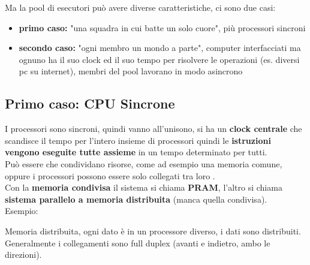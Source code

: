 Ma la pool di esecutori può avere diverse caratteristiche, ci sono due casi: 
\begin{itemize}
	\item \textbf{primo caso:} "una squadra in cui batte un solo cuore", più processori sincroni
	\item \textbf{secondo caso:} "ogni membro un mondo a parte", computer interfacciati ma ognuno ha il suo clock ed il suo tempo per risolvere le operazioni (es. diversi pc su internet), membri del pool lavorano in modo asincrono 
\end{itemize}


\subsection*{Primo caso: CPU Sincrone}
I processori sono sincroni, quindi vanno all'unisono, si ha un \textbf{clock centrale} che scandisce il tempo per l'intero insieme di processori quindi le \textbf{istruzioni vengono eseguite tutte assieme} in un tempo determinato per tutti.\\
Può essere che condividano risorse, come ad esempio una memoria comune, oppure i processori possono essere solo collegati tra loro .\\

Con la \textbf{memoria condivisa} il sistema si chiama \textbf{PRAM}, l'altro si chiama \textbf{sistema parallelo a memoria distribuita} (manca quella condivisa).\\

Esempio: 
\begin{center}
\end{center}

Memoria distribuita, ogni dato è in un processore diverso, i dati sono distribuiti. Generalmente i collegamenti sono full duplex (avanti e indietro, ambo le direzioni).\\

